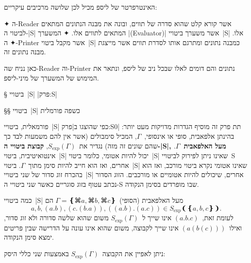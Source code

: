 האינטרפרטר של ליספ מכיל לכן שלושה מרכיבים עיקריים:
\begin{enumerate}
  ✦ ה-Reader אשר קורא קלט שהוא סדרה של תווים, ובונה את מבנה הנתונים המתאים
  לביטוי ה-\E|S| המתאים לתווים אלו.
  ✦ המשערך \E|(Evaluator)| אשר משערך ביטויי~\E|S| אלו.
  ✦ ה-Printer אשר מקבל ביטוי~\E|S| כמבנה נתונים ומתרגם אותו לסדרת תווים אשר
  מייצגת מבנה נתונים זה.
\end{enumerate}

כאן נניח שה-Reader וה-Printer נתונים והם דומים לאלו שבכל ניב של ליספ, ונתאר את
המימוש של המשערך של מיני-ליספ.

§ ביטויי~\E|S|
|פרק:S|

§§ ביטויי~\E|S| כשפה פורמלית

\newcommand\SX{\ensuremath{S_{\text{exp}}}}

 פורמאלית, ביטויי~\E|S| כפי שהוצגו ב|פרק:S0| תת פרק זה מוסיף הגדרות
 מדויקות מעט יותר: בהינתן אלפאבית, סופי או אינסופי,~$Γ$, המכיל סימבולים (אשר
 אין להם משמעות לבד כך שהם שונים זה מזה) נגדיר את~$\SX(Γ)$, \textbf{קבוצת
 ביטויי ה-\E|S|, מעל האלפאבית~$Γ$}. אינטואיטיבית, ביטוי~\E|S| יכול
להיות אטומי, כלומר ביטוי~\E|S| שאינו ניתן לפירוק לביטויי~S אחרים, ואז הוא חייב
להיות סימן מתוך~$Γ$. ביטוי~\E|S| שאינו אטומי נקרא ביטוי מורכב, ואז הוא בהכרח
זוג סדור של שני ביטויי~\E|S| אחרים, שיכולים להיות אטומיים או מורכבים. הזוג
הסדור נכתב עטוף בזוג סוגריים כאשר שני ביטויי ה-S שבו מופרדים בסימן הנקודה.

כמה ביטויי~\E|S| מעל האלפאבית (הסופי)~$Γ=❴⌘a,⌘b,⌘c❵$ הם \[
  a,b,(a.b),(c.(b.a)),((a.b).(a.c))∈\SX❨❴a,b,c❵❩.
\] לעומת זאת,~$(a.b.c)$ אינו שייך ל~$\SX(Γ)$ משום שהוא שלשה סדורה ולא זוג סדור,
ואילו~$(a(b(c)))$ אינו שייך לקבוצה, משום שהוא אינו עונה על הדרישה שבין פריטים
ימצא סימן הנקודה.

ניתן לאפיין את הקבוצה~$\SX(Γ)$ באמצעות שני כללי היסק:

